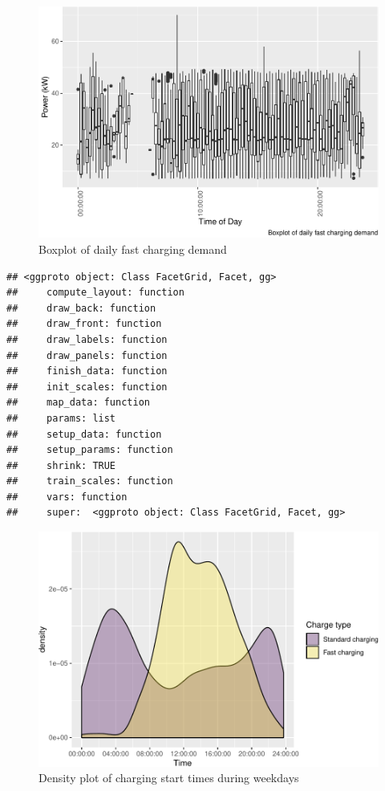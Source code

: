 \documentclass[]{article}
\begin{document}
\begin{figure}
\centering
\includegraphics{EVBB_SummaryReport_files/figure-latex/plot3-1.pdf}
\caption{\label{fig:plot3}Boxplot of daily fast charging demand}
\end{figure}

\begin{verbatim}
## <ggproto object: Class FacetGrid, Facet, gg>
##     compute_layout: function
##     draw_back: function
##     draw_front: function
##     draw_labels: function
##     draw_panels: function
##     finish_data: function
##     init_scales: function
##     map_data: function
##     params: list
##     setup_data: function
##     setup_params: function
##     shrink: TRUE
##     train_scales: function
##     vars: function
##     super:  <ggproto object: Class FacetGrid, Facet, gg>
\end{verbatim}

\begin{figure}
\centering
\includegraphics{EVBB_SummaryReport_files/figure-latex/chargeBeginsWeekday-1.pdf}
\caption{\label{fig:chargeBeginsWeekday}Density plot of charging start times
during weekdays}
\end{figure}
\end{document}
